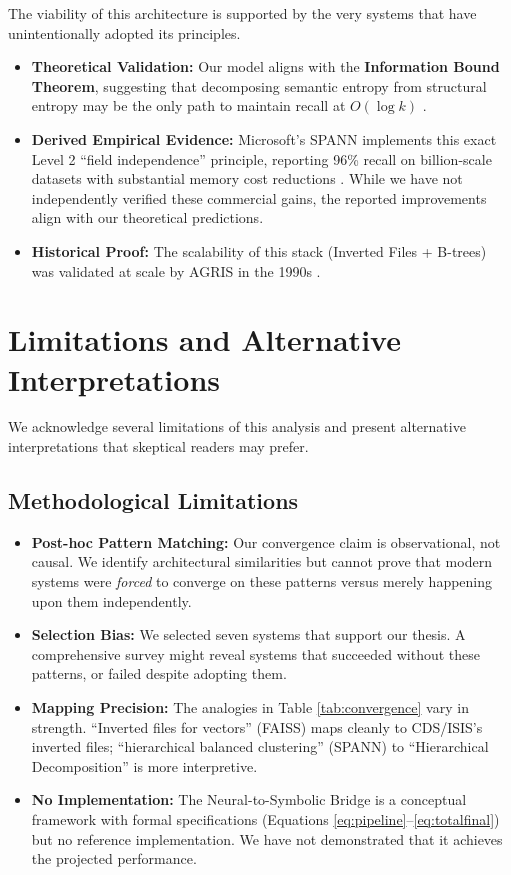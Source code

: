 \documentclass[manuscript,screen,nonacm]{acmart}
\begin{document}
The viability of this architecture is supported by the very systems that have unintentionally adopted its principles.
\begin{itemize}
    \item \textbf{Theoretical Validation:} Our model aligns with the \textbf{Information Bound Theorem}, suggesting that decomposing semantic entropy from structural entropy may be the only path to maintain recall at $O(\log k)$ \cite{korten2025}.
    \item \textbf{Derived Empirical Evidence:} Microsoft's SPANN implements this exact Level 2 ``field independence'' principle, reporting 96\% recall on billion-scale datasets with substantial memory cost reductions \cite{chen2021}. While we have not independently verified these commercial gains, the reported improvements align with our theoretical predictions.
    \item \textbf{Historical Proof:} The scalability of this stack (Inverted Files + B-trees) was validated at scale by AGRIS in the 1990s \cite{fao2005}.
\end{itemize}

\section{Limitations and Alternative Interpretations}

We acknowledge several limitations of this analysis and present alternative interpretations that skeptical readers may prefer.

\subsection{Methodological Limitations}

\begin{itemize}
    \item \textbf{Post-hoc Pattern Matching:} Our convergence claim is observational, not causal. We identify architectural similarities but cannot prove that modern systems were \textit{forced} to converge on these patterns versus merely happening upon them independently.

    \item \textbf{Selection Bias:} We selected seven systems that support our thesis. A comprehensive survey might reveal systems that succeeded without these patterns, or failed despite adopting them.

    \item \textbf{Mapping Precision:} The analogies in Table \ref{tab:convergence} vary in strength. ``Inverted files for vectors'' (FAISS) maps cleanly to CDS/ISIS's inverted files; ``hierarchical balanced clustering'' (SPANN) to ``Hierarchical Decomposition'' is more interpretive.

    \item \textbf{No Implementation:} The Neural-to-Symbolic Bridge is a conceptual framework with formal specifications (Equations \ref{eq:pipeline}--\ref{eq:totalfinal}) but no reference implementation. We have not demonstrated that it achieves the projected performance.
\end{itemize}
\end{document}
